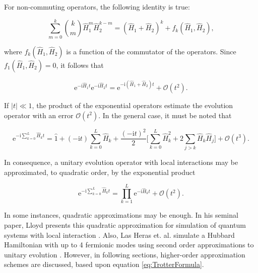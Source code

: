    For non-commuting operators, the following identity is true:

    \begin{equation}
      \sum_{m = 0}^k \binom{k}{m} \hat{H}_1^m \hat{H}_2^{k-m} = (\hat{H}_1 + \hat{H}_2)^k + f_k(\hat{H}_1,\hat{H}_2),
      \label{eq:BinomialTheorem}
    \end{equation}

    \noindent where $f_k(\hat{H}_1,\hat{H}_2)$ is a function of the commutator of the operators. Since $f_1(\hat{H}_1,\hat{H}_2) = 0$, it follows that

    \begin{equation}
      \mathrm{e}^{-\mathrm{i}\hat{H}_1 t}\mathrm{e}^{-\mathrm{i}\hat{H}_2 t} = \mathrm{e}^{-\mathrm{i}(\hat{H}_1 + \hat{H}_2) t} + \mathcal{O}(t^2).
      \label{eq:O2Approx}
    \end{equation}

    If $|t| \ll 1$, the product of the exponential operators estimate the evolution operator with an error $\mathcal{O}(t^2)$. In the general case, it must be noted that

    \begin{equation}
      \mathrm{e}^{-\mathrm{i}\sum_{k = 0}^L \hat{H}_k t} = \hat{1} + (-\mathrm{i}t)\sum_{k = 0}^L \hat{H}_k + \frac{(-\mathrm{i}t)^2}{2} \Bigg[\sum_{k = 0}^L \hat{H}_k^2 + 2 \sum_{j > k}\hat{H}_k \hat{H}_j\Bigg] + \mathcal{O}(t^3).
      \label{eq:TrotterFormula}
    \end{equation}

    In consequence, a unitary evolution operator with local interactions may be approximated, to quadratic order, by the exponential product

    \begin{equation}
      \mathrm{e}^{-\mathrm{i}\sum_{k = 0}^L \hat{H}_k t} = \prod_{k = 1}^{L} \mathrm{e}^{-\mathrm{i}\hat{H}_kt} + \mathcal{O}(t^2).
      \label{eq:2ndOrderTrotter}
    \end{equation}

    In some instances, quadratic approximations may be enough. In his seminal paper, Lloyd presents this quadratic approximation for simulation of quantum systems with local interaction \cite{LloydNature}. Also, Las Heras et. al. simulate a Hubbard Hamiltonian with up to 4 fermionic modes using second order approximations to unitary evolution \cite{HubbardSimul, HubbardSimulLasHeras}. However, in following sections, higher-order approximation schemes are discussed, based upon equation \ref{eq:TrotterFormula}.

